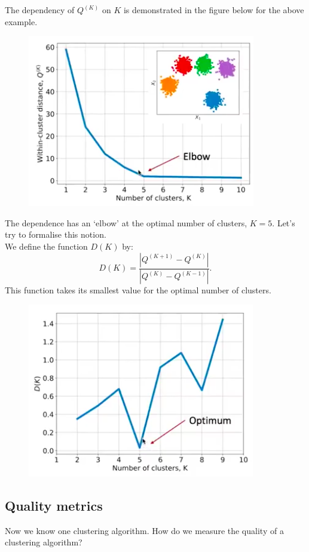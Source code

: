 The dependency of $Q^{(K)}$ on $K$ is demonstrated in the figure below for the above example.
\begin{figure}[H]
\centering
\includegraphics[scale=0.4]{elbow.png}
\end{figure}
The dependence has an `elbow' at the optimal number of clusters, $K=5$. Let's try to formalise this notion.\\

We define the function $D(K)$ by:
\begin{equation*}
D(K) = \frac{|Q^{(K+1)} - Q^{(K)}|}{|Q^{(K)} - Q^{(K-1)}|}.
\end{equation*}
This function takes its smallest value for the optimal number of clusters.

\begin{figure}[H]
\centering
\includegraphics[scale=0.4]{optimalclusters.png}
\end{figure}




\newpage
\subsection{Quality metrics}
Now we know one clustering algorithm. How do we measure the quality of a clustering algorithm?\\

